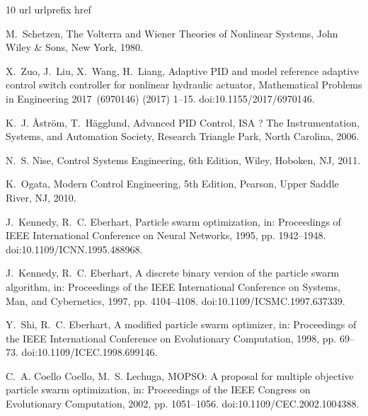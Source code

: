 \documentclass[preprint,12pt]{elsarticle}
\begin{document}
\begin{thebibliography}{10}
	\expandafter\ifx\csname url\endcsname\relax
	\def\url#1{\texttt{#1}}\fi
	\expandafter\ifx\csname urlprefix\endcsname\relax\def\urlprefix{URL }\fi
	\expandafter\ifx\csname href\endcsname\relax
	\def\href#1#2{#2} \def\path#1{#1}\fi
	
	M.~Schetzen, The Volterra and Wiener Theories of Nonlinear Systems, John Wiley
	\& Sons, New York, 1980.
	
	X.~Zuo, J.~Liu, X.~Wang, H.~Liang, Adaptive {PID} and model reference adaptive
	control switch controller for nonlinear hydraulic actuator, Mathematical
	Problems in Engineering 2017~(6970146) (2017) 1--15.
	\newblock \href {https://doi.org/10.1155/2017/6970146}
	{\path{doi:10.1155/2017/6970146}}.
	
	K.~J. \AA{}str\"{o}m, T.~H\"{a}gglund, Advanced PID Control, ISA ? The
	Instrumentation, Systems, and Automation Society, Research Triangle Park,
	North Carolina, 2006.
	
	N.~S. Nise, Control Systems Engineering, 6th Edition, Wiley, Hoboken, NJ, 2011.
	
	K.~Ogata, Modern Control Engineering, 5th Edition, Pearson, Upper Saddle River,
	NJ, 2010.
	
	J.~Kennedy, R.~C. Eberhart, Particle swarm optimization, in: Proceedings of
	IEEE International Conference on Neural Networks, 1995, pp. 1942--1948.
	\newblock \href {https://doi.org/10.1109/ICNN.1995.488968}
	{\path{doi:10.1109/ICNN.1995.488968}}.
	
	J.~Kennedy, R.~C. Eberhart, A discrete binary version of the particle swarm
	algorithm, in: Proceedings of the IEEE International Conference on Systems,
	Man, and Cybernetics, 1997, pp. 4104--4108.
	\newblock \href {https://doi.org/10.1109/ICSMC.1997.637339}
	{\path{doi:10.1109/ICSMC.1997.637339}}.
	
	Y.~Shi, R.~C. Eberhart, A modified particle swarm optimizer, in: Proceedings of
	the IEEE International Conference on Evolutionary Computation, 1998, pp.
	69--73.
	\newblock \href {https://doi.org/10.1109/ICEC.1998.699146}
	{\path{doi:10.1109/ICEC.1998.699146}}.
	
	C.~A. {Coello Coello}, M.~S. Lechuga, {MOPSO}: A proposal for multiple
	objective particle swarm optimization, in: Proceedings of the IEEE Congress
	on Evolutionary Computation, 2002, pp. 1051--1056.
	\newblock \href {https://doi.org/10.1109/CEC.2002.1004388}
	{\path{doi:10.1109/CEC.2002.1004388}}.
	

\end{thebibliography}
\end{document}
